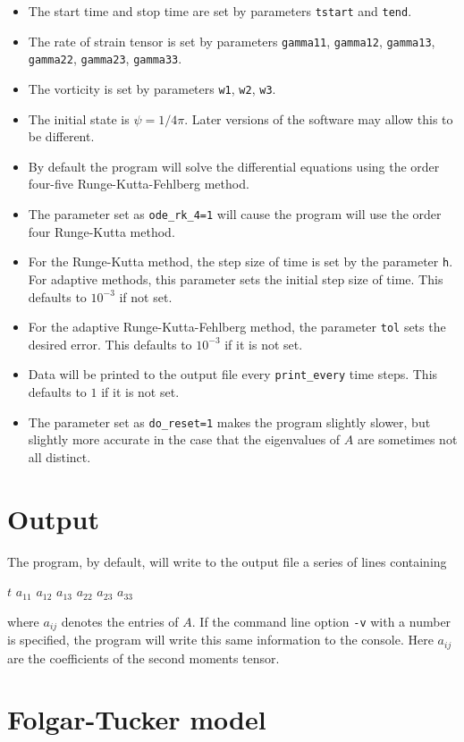 \documentclass{amsart}
\begin{document}
\begin{itemize}
\item The start time and stop time are set by parameters {\tt tstart} and {\tt tend}.
\item The rate of strain tensor is set by parameters {\tt gamma11}, {\tt gamma12}, {\tt gamma13}, {\tt gamma22}, {\tt gamma23}, {\tt gamma33}.
\item The vorticity is set by parameters {\tt w1}, {\tt w2}, {\tt w3}.
\item The initial state is $\psi = 1/4\pi$.  Later versions of the software may allow this to be different.
\item By default the program will solve the differential equations using the order four-five Runge-Kutta-Fehlberg method.
\item The parameter set as {\tt ode\_rk\_4=1} will cause the program will use the order four Runge-Kutta method.
\item For the Runge-Kutta method, the step size of time is set by the parameter {\tt h}.  For adaptive methods, this parameter sets the initial step size of time.  This defaults to $10^{-3}$ if not set.
\item For the adaptive Runge-Kutta-Fehlberg method, the parameter {\tt tol} sets the desired error.  This defaults to $10^{-3}$ if it is not set.
\item Data will be printed to the output file every {\tt print\_every} time steps.  This defaults to $1$ if it is not set.
\item The parameter set as {\tt do\_reset=1} makes the program slightly slower, but slightly more accurate in the case that the eigenvalues of $A$ are sometimes not all distinct.
\end{itemize}

\section*{Output}

\noindent
The program, by default, will write to the output file a series of lines containing
\begin{center}$t$ $a_{11}$ $a_{12}$ $a_{13}$ $a_{22}$ $a_{23}$ $a_{33}$\end{center}
where $a_{ij}$ denotes the entries of $A$.  If the command line option {\tt -v} with a number is specified, the program will write this same information to the console.  Here $a_{ij}$ are the coefficients of the second moments tensor.

\section*{Folgar-Tucker model}
\end{document}
